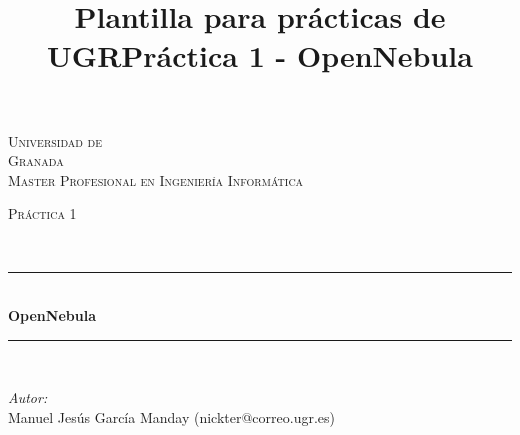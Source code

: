 \documentclass[10pt]{article}
\title{Plantilla para prácticas de UGR}
\title{Práctica 1 - OpenNebula}
\begin{document}
\begin{center}																		%
\newcommand{\HRule}{\rule{\linewidth}{0.5mm}}									%
\begin{minipage}{0.48\textwidth} \begin{flushleft}
\end{flushleft}\end{minipage}
\begin{minipage}{0.48\textwidth} \begin{flushright}
\end{flushright}\end{minipage}

\vspace*{-1.5cm}								%
\textsc{\huge Universidad de\\ \vspace{5px} Granada}\\[1.5cm]	

\textsc{\LARGE Master Profesional en Ingenier\'ia Inform\'atica }\\[1.5cm]													%

\begin{minipage}{0.9\textwidth} 
\begin{center}																					%
\textsc{\LARGE Pr\'actica 1}
\end{center}
\end{minipage}\\[0.5cm]
 			\vspace*{1cm}																		%
\HRule \\[0.4cm]																	%
{ \huge \bfseries OpenNebula}\\[0.4cm]	%
\HRule \\[1.5cm]																	%
\begin{minipage}{0.46\textwidth}													%
\begin{flushleft} \large															%
\emph{Autor:}\\	
Manuel Jes\'us Garc\'ia Manday (nickter@correo.ugr.es)\\
\end{flushleft}																		%
\end{minipage}		
\begin{minipage}{0.52\textwidth}		
\vspace{-0.6cm}											%
\begin{flushright} \large															%
\end{flushright}																	%
\end{minipage}	
\vspace*{1cm}
 	

\end{center}
\end{document}
